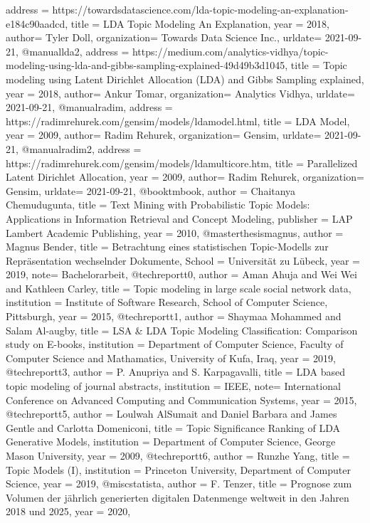 \documentclass[german,version-2020-11]{uzl-thesis}
\begin{document}
\begin{bibtex-entries}
{  address =       {https://towardsdatascience.com/lda-topic-modeling-an-explanation-e184c90aadcd},
  title =        {LDA Topic Modeling An Explanation},
  year =    {2018},
  author= {Tyler Doll},
  organization= {Towards Data Science Inc.},
 urldate= {2021-09-21},
}
  @manual{lda2,
  address =       {https://medium.com/analytics-vidhya/topic-modeling-using-lda-and-gibbs-sampling-explained-49d49b3d1045},
  title =        {Topic modeling using Latent Dirichlet Allocation (LDA) and Gibbs Sampling explained},
  year =    {2018},
  author= {Ankur Tomar},
  organization= {Analytics Vidhya},
   urldate= {2021-09-21},
}
  @manual{radim,
  address =       {https://radimrehurek.com/gensim/models/ldamodel.html},
  title =        {LDA Model},
  year =    {2009},
  author= {Radim Rehurek},
  organization= {Gensim},
   urldate= {2021-09-21},
}
  @manual{radim2,
  address =       {https://radimrehurek.com/gensim/models/ldamulticore.htm},
  title =        {Parallelized Latent Dirichlet Allocation},
  year =    {2009},
  author= {Radim Rehurek},
  organization= {Gensim},
 urldate= {2021-09-21},
}
  @book{tmbook,
  author =       {Chaitanya Chemudugunta},
  title =        {Text Mining with Probabilistic Topic Models: Applications in Information Retrieval and Concept Modeling},
  publisher = {LAP Lambert Academic Publishing},
  year =    {2010},
}
  @masterthesis{magnus,
  author =       {Magnus Bender},
  title =        {Betrachtung eines statistischen Topic-Modells zur Repräsentation wechselnder Dokumente},
  School = {Universität zu Lübeck},
  year =    {2019},
  note= {Bachelorarbeit},
}
  @techreport{t0,
  author =       {Aman Ahuja and Wei Wei and Kathleen Carley},
  title =        {Topic modeling in large scale social network data},
  institution = {Institute of Software Research, School of Computer Science, Pittsburgh},
  year =    {2015},
}
  @techreport{t1,
  author =       {Shaymaa Mohammed and Salam Al-augby},
  title =        {LSA \& LDA Topic Modeling Classification: Comparison study on E-books},
  institution = {Department of Computer Science, Faculty of Computer Science and Mathamatics, University of Kufa, Iraq},
  year =    {2019},
}
  @techreport{t3,
  author =       {P. Anupriya and S. Karpagavalli},
  title =        {LDA based topic modeling of journal abstracts},
  institution = {IEEE},
  note= {International Conference on Advanced Computing and Communication Systems},
  year =    {2015},
}
  @techreport{t5,
  author =       {Loulwah AlSumait and Daniel Barbara and James Gentle and Carlotta Domeniconi},
  title =        {Topic Significance Ranking of LDA Generative Models},
  institution = {Department of Computer Science, George Mason University},
  year =    {2009},
}
  @techreport{t6,
  author =       {Runzhe Yang},
  title =        {Topic Models (I)},
  institution = {Princeton University, Department of Computer Science},
  year =    {2019},
}
  @misc{statista,
  author =       {F. Tenzer},
  title =        {Prognose zum Volumen der jährlich generierten digitalen Datenmenge weltweit in den Jahren 2018 und 2025},
  year =    {2020},
}
\end{bibtex-entries}
\end{document}
